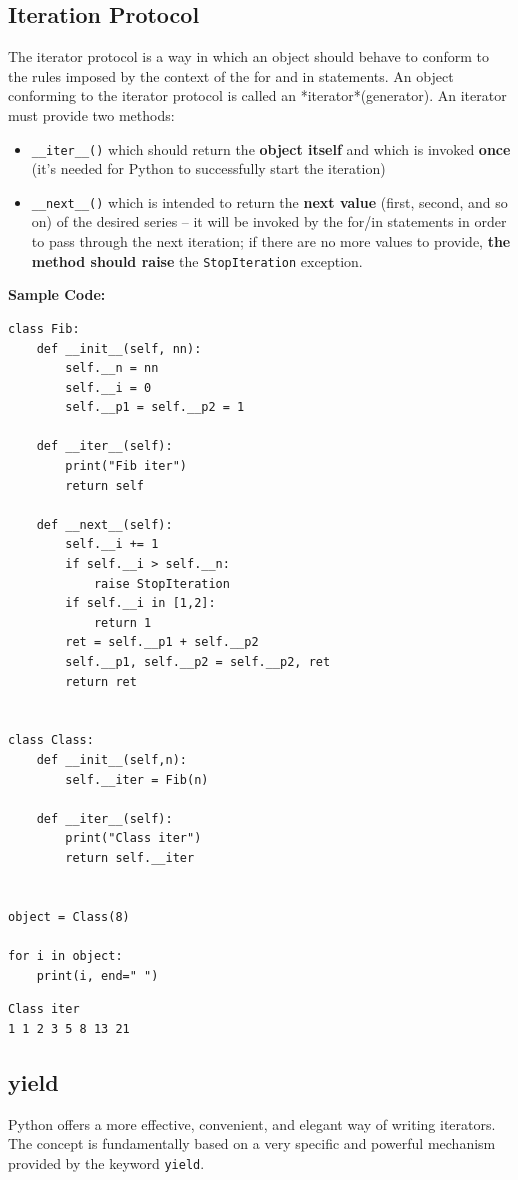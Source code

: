 \documentclass[11pt]{article}
\begin{document}
\subsection{Iteration Protocol}
\label{sec:org3f6b17c}
The iterator protocol is a way in which an object should behave to
conform to the rules imposed by the context of the for and in
statements. An object conforming to the iterator protocol is called an
*iterator*(generator). An iterator must provide two methods:

\begin{itemize}
\item \texttt{\_\_iter\_\_()} which should return the \textbf{object itself} and which is
invoked \textbf{once} (it’s needed for Python to successfully start the
iteration)

\item \texttt{\_\_next\_\_()} which is intended to return the \textbf{next value} (first,
second, and so on) of the desired series – it will be invoked by the
for/in statements in order to pass through the next iteration; if
there are no more values to provide, \textbf{the method should raise} the
\texttt{StopIteration} exception.
\end{itemize}

\textbf{Sample Code:}

\begin{verbatim}
class Fib:
	def __init__(self, nn):
		self.__n = nn
		self.__i = 0
		self.__p1 = self.__p2 = 1

	def __iter__(self):
		print("Fib iter")
		return self

	def __next__(self):
		self.__i += 1
		if self.__i > self.__n:
			raise StopIteration
		if self.__i in [1,2]:
			return 1
		ret = self.__p1 + self.__p2
		self.__p1, self.__p2 = self.__p2, ret
		return ret


class Class:
	def __init__(self,n):
		self.__iter = Fib(n)

	def __iter__(self):
		print("Class iter")
		return self.__iter


object = Class(8)

for i in object:
	print(i, end=" ")

\end{verbatim}

\begin{verbatim}
Class iter
1 1 2 3 5 8 13 21 
\end{verbatim}

\subsection{yield}
\label{sec:org870fd19}
Python offers a more effective, convenient, and elegant way of writing
iterators. The concept is fundamentally based on a very specific and
powerful mechanism provided by the keyword \texttt{yield}. 
\end{document}
